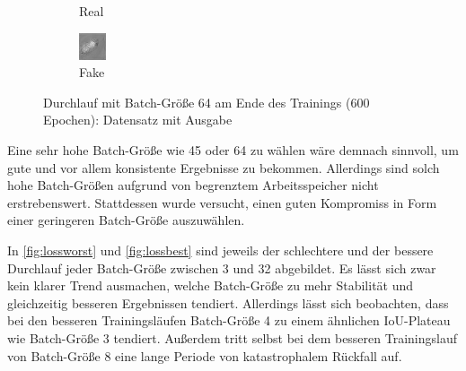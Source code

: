\begin{figure}
\begin{subfigure}{.19\textwidth}
		\caption{Real}
	\end{subfigure}
	\begin{subfigure}{.19\textwidth}
		\centering
		\includegraphics[width=.9\linewidth,interpolate=false]{img/results/b64_fake}
		\caption{Fake}
	\end{subfigure}
	\caption{Durchlauf mit Batch-Größe 64 am Ende des Trainings (600 Epochen): Datensatz mit Ausgabe}
	\label{fig:outputsb64}
\end{figure}

Eine sehr hohe Batch-Größe wie 45 oder 64 zu wählen wäre demnach sinnvoll, um gute und vor allem konsistente Ergebnisse zu bekommen.
Allerdings sind solch hohe Batch-Größen aufgrund von begrenztem Arbeitsspeicher nicht erstrebenswert.
Stattdessen wurde versucht, einen guten Kompromiss in Form einer geringeren Batch-Größe auszuwählen.

In \autoref{fig:lossworst} und \autoref{fig:lossbest} sind jeweils der schlechtere und der bessere Durchlauf jeder Batch-Größe zwischen 3 und 32 abgebildet.
Es lässt sich zwar kein klarer Trend ausmachen, welche Batch-Größe zu mehr Stabilität und gleichzeitig besseren Ergebnissen tendiert.
Allerdings lässt sich beobachten, dass bei den besseren Trainingsläufen Batch-Größe 4 zu einem ähnlichen IoU-Plateau wie Batch-Größe 3 tendiert.
Außerdem tritt selbst bei dem besseren Trainingslauf von Batch-Größe 8 eine lange Periode von katastrophalem Rückfall auf.

